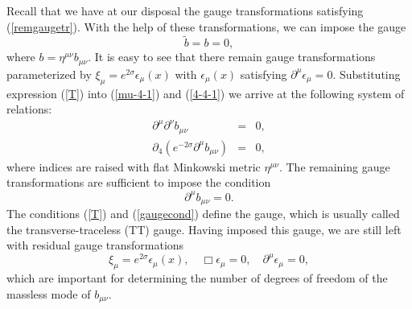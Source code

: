 \documentclass[a4paper,12pt]{article}
\begin{document}
Recall that we have at our disposal the gauge transformations satisfying
(\ref{remgaugetr}). With the help of these transformations, we can impose
the gauge
\begin{equation}\label{T}
\tilde b = b =0,
\end{equation}
where $b=\eta^{\mu\nu}b_{\mu\nu}$. It is easy to see that there
remain gauge transformations parameterized by $\xi_\mu =
e^{2\sigma}\epsilon_\mu(x)$ with $\epsilon_\mu(x)$ satisfying
$\partial^\mu \epsilon_\mu = 0$. Substituting expression (\ref{T})
into (\ref{mu-4-1}) and (\ref{4-4-1}) we arrive at the following
system of relations:
\begin{eqnarray}
\label{system3} \label{equ1}
\partial^\mu \partial^\nu  b_{\mu\nu}& =&0, \\
\label{equ2}
\partial_4 (e^{-2\sigma} \partial^\mu  b_{\mu\nu})&=&0,
\end{eqnarray}
where indices are raised with flat Minkowski metric $\eta^{\mu\nu}$. The
remaining gauge transformations are sufficient to impose the condition
\begin{equation}\label{gaugecond}
 \partial^\mu  b_{\mu\nu} = 0.
\end{equation}
The conditions (\ref{T}) and (\ref{gaugecond}) define the gauge, which is
usually called the transverse-traceless (TT) gauge. Having imposed this
gauge, we are still left with residual gauge transformations
\begin{equation}
\label{gaugetr} \xi_\mu = e^{2\sigma}\epsilon_\mu(x), \quad
\Box\epsilon_\mu = 0, \quad \partial^\mu \epsilon_\mu = 0,
\end{equation}
which are important for determining the number of degrees of
freedom of the massless mode of $b_{\mu\nu}$.
\end{document}
